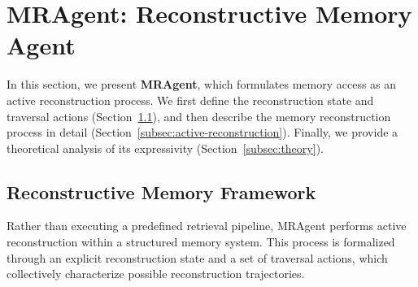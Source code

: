 \section{MRAgent: Reconstructive Memory Agent}


In this section, we present \textbf{MRAgent}, which formulates memory access as an active reconstruction process. We first define the reconstruction state and traversal actions (Section~\ref{subsec:reconstructive}), and then describe the memory reconstruction process in detail (Section~\ref{subsec:active-reconstruction}).
Finally, we provide a theoretical analysis of its expressivity (Section~\ref{subsec:theory}).

\subsection{Reconstructive Memory Framework}
\label{subsec:reconstructive}

Rather than executing a predefined retrieval pipeline, MRAgent  performs active reconstruction within a structured memory system. This process is formalized through an explicit reconstruction state and a set of traversal actions, which collectively characterize possible reconstruction trajectories.  


